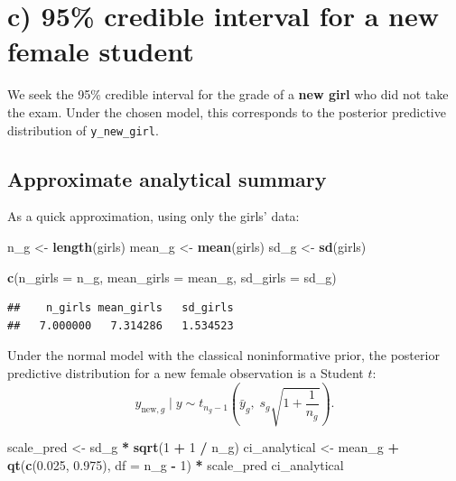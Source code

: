 \documentclass[
  english,
  12pt,
]{article}
\newenvironment{Shaded}{\begin{snugshade}}{\end{snugshade}}
\newcommand{\AttributeTok}[1]{\textcolor[rgb]{0.13,0.29,0.53}{#1}}
\newcommand{\DecValTok}[1]{\textcolor[rgb]{0.00,0.00,0.81}{#1}}
\newcommand{\FloatTok}[1]{\textcolor[rgb]{0.00,0.00,0.81}{#1}}
\newcommand{\FunctionTok}[1]{\textcolor[rgb]{0.13,0.29,0.53}{\textbf{#1}}}
\newcommand{\NormalTok}[1]{#1}
\newcommand{\OtherTok}[1]{\textcolor[rgb]{0.56,0.35,0.01}{#1}}
\newcommand{\SpecialCharTok}[1]{\textcolor[rgb]{0.81,0.36,0.00}{\textbf{#1}}}
\begin{document}
\section{c) 95\% credible interval for a new female
student}\label{c-95-credible-interval-for-a-new-female-student}

We seek the 95\% credible interval for the grade of a \textbf{new girl}
who did not take the exam. Under the chosen model, this corresponds to
the posterior predictive distribution of \texttt{y\_new\_girl}.

\subsection{Approximate analytical
summary}\label{approximate-analytical-summary}

As a quick approximation, using only the girls' data:

\begin{Shaded}
\begin{Highlighting}[]
\NormalTok{n\_g }\OtherTok{\textless{}{-}} \FunctionTok{length}\NormalTok{(girls)}
\NormalTok{mean\_g }\OtherTok{\textless{}{-}} \FunctionTok{mean}\NormalTok{(girls)}
\NormalTok{sd\_g }\OtherTok{\textless{}{-}} \FunctionTok{sd}\NormalTok{(girls)}

\FunctionTok{c}\NormalTok{(}\AttributeTok{n\_girls =}\NormalTok{ n\_g, }\AttributeTok{mean\_girls =}\NormalTok{ mean\_g, }\AttributeTok{sd\_girls =}\NormalTok{ sd\_g)}
\end{Highlighting}
\end{Shaded}

\begin{verbatim}
##    n_girls mean_girls   sd_girls 
##   7.000000   7.314286   1.534523
\end{verbatim}

Under the normal model with the classical noninformative prior, the
posterior predictive distribution for a new female observation is a
Student \(t\): \[
y_{\text{new},g} \mid y \sim t_{n_g-1}\left(\bar y_g,\; s_g\sqrt{1+\frac{1}{n_g}}\right).
\]

\begin{Shaded}
\begin{Highlighting}[]
\NormalTok{scale\_pred }\OtherTok{\textless{}{-}}\NormalTok{ sd\_g }\SpecialCharTok{*} \FunctionTok{sqrt}\NormalTok{(}\DecValTok{1} \SpecialCharTok{+} \DecValTok{1} \SpecialCharTok{/}\NormalTok{ n\_g)}
\NormalTok{ci\_analytical }\OtherTok{\textless{}{-}}\NormalTok{ mean\_g }\SpecialCharTok{+} \FunctionTok{qt}\NormalTok{(}\FunctionTok{c}\NormalTok{(}\FloatTok{0.025}\NormalTok{, }\FloatTok{0.975}\NormalTok{), }\AttributeTok{df =}\NormalTok{ n\_g }\SpecialCharTok{{-}} \DecValTok{1}\NormalTok{) }\SpecialCharTok{*}\NormalTok{ scale\_pred}
\NormalTok{ci\_analytical}
\end{Highlighting}
\end{Shaded}
\end{document}
